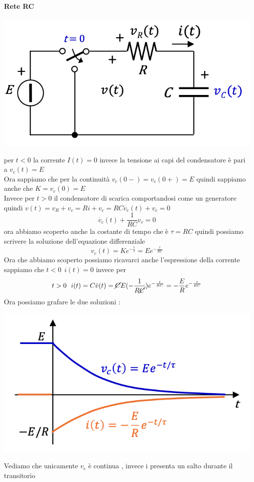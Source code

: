 \documentclass{article}
\theoremstyle{definition}
\begin{document}
\paragraph{Rete RC}
\begin{center}
	\includegraphics[scale=0.40]{immagini/rc1}
\end{center}
per $t <0$ la corrente $I(t)=0$ invece la tensione ai capi del condensatore è pari a $v_c(t)=E$\\
Ora sappiamo che per la continuità $v_c(0-)=v_c(0+)=E$ quindi sappiamo anche che $K=v_c(0)=E$\\
Invece per $t >0$ il condensatore di scarica comportandosi come un generatore quindi $v(t)=v_R+v_c=Ri+v_c=RC \dot{v_c}(t)+v_c=0$
$$\dot{v_c}(t)+\frac{1}{RC}v_c=0$$
ora abbiamo scoperto anche la costante di tempo che è $\tau=RC$ quindi possiamo scrivere la soluzione dell'equazione differenziale 
$$v_c(t)=Ke^{-\frac{t}{\tau}}=Ee^{-\frac{t}{RC}}$$
Ora che abbiamo scoperto possiamo ricavarci anche l'espressione della corrente 
sappiamo che $t<0 \ \ i(t)=0$ invece per $$t > 0 \ \ i(t)=C \dot{v}(t)=\cancel{C}E(-\frac{1}{R\cancel{C}})e^{-\frac{t}{RC}}=-\frac{E}{R}e^{-\frac{t}{RC}}$$
Ora possiamo grafare le due soluzioni : 
\begin{center}
	\includegraphics[scale=0.45]{immagini/g}
\end{center}
Vediamo che unicamente $v_c$ è continua , invece i presenta un salto durante il transitorio 
\end{document}
